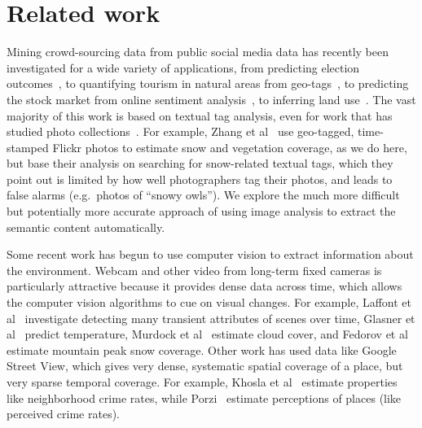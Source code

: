 \section{Related work}

Mining crowd-sourcing data from public social media data has recently
been investigated for a wide variety of applications, from predicting
election outcomes~\cite{you2015multifacetedelections}, to quantifying
tourism in natural areas from geo-tags~\cite{wood2013usingtourism}, to
predicting the stock market from online sentiment
analysis~\cite{bollen11twitter}, to inferring land
use~\cite{vsecerov2015analysis}. The vast majority of this work is
based on textual tag analysis, even for work that has studied photo
collections~\cite{you2015multifacetedelections,vsecerov2015analysis,wood2013usingtourism}.
For example, Zhang et al~\cite{ecology2012www} use geo-tagged,
time-stamped Flickr photos to estimate snow and vegetation coverage,
as we do here, but base their analysis on searching for snow-related
textual tags, which they point out is limited by how well
photographers tag their photos, and leads to false alarms
(e.g.\ photos of ``snowy owls'').  We explore the much more difficult
but potentially more accurate approach of using image analysis to
extract the semantic content automatically.

Some recent work has begun to use computer vision to extract
information about the environment. Webcam and other video from
long-term fixed cameras is particularly attractive because it provides
dense data across time, which allows the computer vision algorithms to
cue on visual changes.  For example, Laffont et
al~\cite{laffont2014transient} investigate detecting many transient
attributes of scenes over time, Glasner et al~\cite{glasner2015hot}
predict temperature, Murdock et al~\cite{murdock2015building, murdock}
estimate cloud cover, and Fedorov et al~\cite{feorov2015snowwatch,
  fedorov2014snow} estimate mountain peak snow coverage.  Other work
has used data like Google Street View, which gives very dense,
systematic spatial coverage of a place, but very sparse temporal
coverage. For example, Khosla et al~\cite{khosla2014looking} estimate
properties like neighborhood crime rates, while
Porzi~\cite{porzi2015predicting} estimate perceptions of places (like
perceived crime rates).

